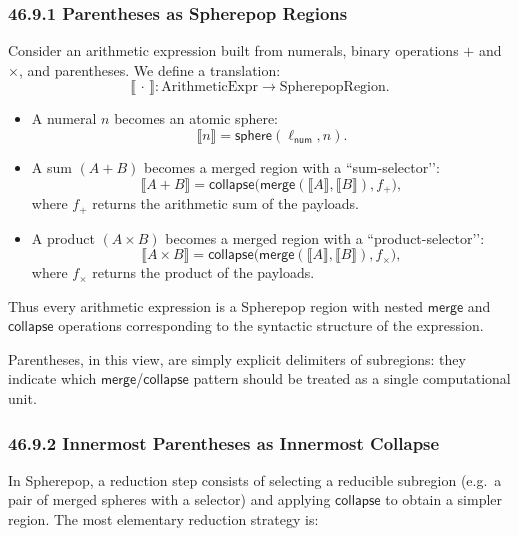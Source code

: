 \documentclass[12pt,letterpaper]{article}
\theoremstyle{remark}
\begin{document}
\subsubsection*{46.9.1 Parentheses as Spherepop Regions}

Consider an arithmetic expression built from numerals, binary operations
$+$ and $\times$, and parentheses. We define a translation:
\[
\llbracket \,\cdot\, \rrbracket : \text{ArithmeticExpr} \to \text{SpherepopRegion}.
\]

\begin{itemize}
  \item A numeral $n$ becomes an atomic sphere:
    \[
    \llbracket n \rrbracket = \mathsf{sphere}(\ell_{\mathsf{num}}, n).
    \]
  \item A sum $(A + B)$ becomes a merged region with a ``sum-selector’’:
    \[
    \llbracket A + B \rrbracket 
    = \mathsf{collapse}\big(
        \mathsf{merge}(\llbracket A \rrbracket, \llbracket B \rrbracket),
        f_{+}
      \big),
    \]
    where $f_{+}$ returns the arithmetic sum of the payloads.
  \item A product $(A \times B)$ becomes a merged region with a
        ``product-selector’’:
    \[
    \llbracket A \times B \rrbracket 
    = \mathsf{collapse}\big(
        \mathsf{merge}(\llbracket A \rrbracket, \llbracket B \rrbracket),
        f_{\times}
      \big),
    \]
    where $f_{\times}$ returns the product of the payloads.
\end{itemize}

Thus every arithmetic expression is a Spherepop region with nested
$\mathsf{merge}$ and $\mathsf{collapse}$ operations corresponding to the syntactic
structure of the expression.

Parentheses, in this view, are simply explicit delimiters of subregions:
they indicate which $\mathsf{merge}$/$\mathsf{collapse}$ pattern should be treated as a 
single computational unit.

\subsubsection*{46.9.2 Innermost Parentheses as Innermost Collapse}

In Spherepop, a reduction step consists of selecting a reducible subregion 
(e.g.\ a pair of merged spheres with a selector) and applying $\mathsf{collapse}$ to
obtain a simpler region. The most elementary reduction strategy is:
\end{document}
